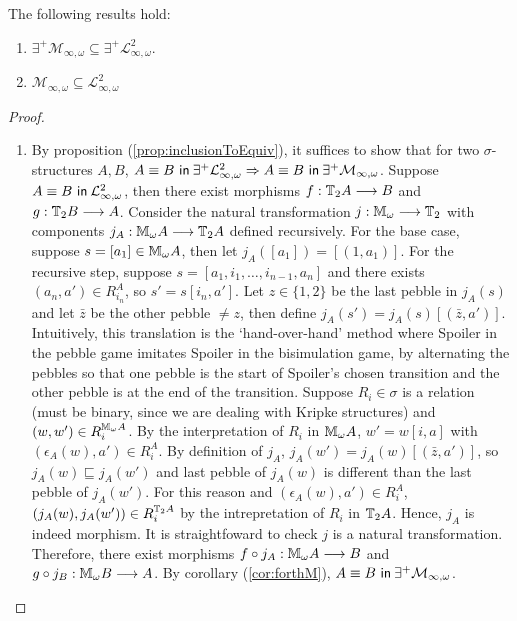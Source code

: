 \begin{prop}
The following results hold:
\begin{enumerate}[label=(\arabic*)]
\item $\exists^{+}\mathcal{M}_{\infty,\omega} \subseteq \exists^{+}\mathcal{L}^{2}_{\infty,\omega}$.
\item $\mathcal{M}_{\infty,\omega} \subseteq \mathcal{L}^{2}_{\infty,\omega}$
\end{enumerate}
\begin{proof}
\begin{enumerate}[label=(\arabic*)]
\item By proposition (\ref{prop:inclusionToEquiv}), it suffices to show that for two $\sigma$-structures $A,B$, ${A \equiv B \ \mathsf{in}\: \exists^{+}\mathcal{L}^{2}_{\infty,\omega}} \Rightarrow {A \equiv B \ \mathsf{in}\: \exists^{+}\mathcal{M}_{\infty,\omega}}$. Suppose ${A \equiv B \ \mathsf{in}\: \mathcal{L}^{2}_{\infty,\omega}}$, then there exist morphisms $f:{\mathbb{T}_{2}A} \longrightarrow B$ and $g:{\mathbb{T}_{2}B} \longrightarrow A$. Consider the natural transformation $j:{\mathbb{M}_{\omega}} \longrightarrow {\mathbb{T}_{2}}$ with components $j_{A}:{\mathbb{M}_{\omega}A} \longrightarrow {\mathbb{T}_{2}A}$ defined recursively. For the base case, suppose $s = [a_{1}] \in {\mathbb{M}_{\omega}A}$, then let $j_{A}([a_{1}]) = [(1,a_{1})]$. For the recursive step, suppose $s = [a_{1},i_{1},\dots,i_{n-1},a_{n}]$ and there exists $(a_{n},a') \in R_{i_{n}}^{A}$, so $s' = s[i_{n},a']$. Let $z \in \{1,2\}$ be the last pebble in $j_{A}(s)$ and let $\bar{z}$ be the other pebble $\not= z$, then define $j_{A}(s') = j_{A}(s)[(\bar{z},a')]$.  Intuitively, this translation is the `hand-over-hand' method where Spoiler in the pebble game imitates Spoiler in the bisimulation game, by alternating the pebbles so that one pebble is the start of Spoiler's chosen transition and the other pebble is at the end of the transition. Suppose $R_{i} \in \sigma$ is a relation (must be binary, since we are dealing with Kripke structures) and $(w,w') \in R_{i}^{{\mathbb{M}_{\omega}A}}$. By the interpretation of $R_{i}$ in ${\mathbb{M}_{\omega}A}$, $w' = w[i,a]$ with $(\epsilon_{A}(w),a') \in R_{i}^{A}$. By definition of $j_{A}$, $j_{A}(w') = j_{A}(w)[(\bar{z},a')]$, so $j_{A}(w) \sqsubseteq j_{A}(w')$ and last pebble of $j_{A}(w)$ is different than the last pebble of $j_{A}(w')$. For this reason and $(\epsilon_{A}(w),a') \in R_{i}^{A}$, $(j_{A}(w),j_{A}(w')) \in R_{i}^{{\mathbb{T}_{2}A}}$ by the intrepretation of $R_{i}$ in ${\mathbb{T}_{2}A}$. Hence, $j_{A}$ is indeed morphism. It is straightfoward to check $j$ is a natural transformation. Therefore, there exist morphisms $f \circ j_{A}: {\mathbb{M}_{\omega}A} \longrightarrow B$ and $g \circ j_{B}:{\mathbb{M}_{\omega}B} \longrightarrow A$. By corollary (\ref{cor:forthM}), ${A \equiv B \ \mathsf{in}\: \exists^{+}\mathcal{M}_{\infty,\omega}}$. 
\end{enumerate}
\end{proof}
\end{prop}
